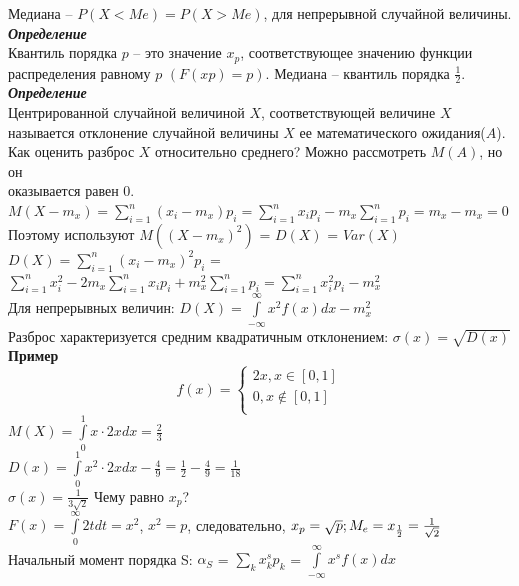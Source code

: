 \documentclass[russian, 12pt, fleqn]{article}
\begin{document}
Медиана -- $P(X<Me) = P(X>Me)$, для непрерывной случайной величины.\\
\textit{\textbf{Определение}}\\
Квантиль порядка $p$ -- это значение $x_p$, соответствующее значению функции распределения равному $p$ $(F(xp)=p)$. Медиана -- квантиль порядка $\frac{1}{2}$.\\
\textit{\textbf{Определение}}\\
Центрированной случайной величиной $X$, соответствующей величине $X$ называется отклонение случайной величины $X$ ее математического ожидания($A$).
Как оценить разброс $X$ относительно среднего? Можно рассмотреть $M(A)$, но он\\ оказывается равен 0.\\
$M(X - m_x) = \sum\limits_{i=1}^{n}(x_i-m_x)p_i=\sum\limits_{i=1}^{n}x_ip_i - m_x\sum\limits_{i=1}^{n}p_i = m_x - m_x = 0$\\
Поэтому используют $M((X-m_x)^2)$ = $D(X)$ = $Var(X)$\\
$D(X)= \sum\limits_{i=1}^{n} (x_i - m_x)^2p_i$ = $\sum\limits_{i=1}^{n}x_i^2 - 2m_x\sum\limits_{i=1}^{n}x_ip_i + m_x^2\sum\limits_{i=1}^{n}p_i = \sum\limits_{i=1}^{n}x_i^2p_i - m_x^2$\\
Для непрерывных величин: $D(X) = \int\limits_{-\infty}^{\infty}x^2f(x)dx - m_x^2$\\
Разброс характеризуется средним квадратичным отклонением: $\sigma(x) = \sqrt{D(x)}$\\
\textbf{Пример\ }\\
\begin{equation} 
f(x)=
 \begin{cases}
   2x,  x \in [0, 1]\\
   0 , x \notin [0, 1]\\
 \end{cases}
\end{equation}
$M(X) = \int\limits_{0}^{1}x\cdot 2x d x  = \frac{2}{3}$\\
$D(x) = \int\limits_{0}^{1}x^2\cdot 2x d x - \frac{4}{9} = \frac{1}{2} - \frac{4}{9} = \frac{1}{18}$\\
$\sigma(x) = \frac{1}{3\sqrt{2}}$
Чему равно $x_p$?\\
$F(x) = \int\limits_{0}^{\infty}2tdt = x^2$, $x^2 = p$, следовательно, $x_p = \sqrt{p};\\
 M_e = x_\frac{1}{2} = \frac{1}{\sqrt{2}}$\\
Начальный момент порядка S: $\alpha_S$ = $\sum\limits_{k} x^s_kp_k$  = $\int\limits_{-\infty}^{\infty}x^sf(x)dx$\\
\end{document}
